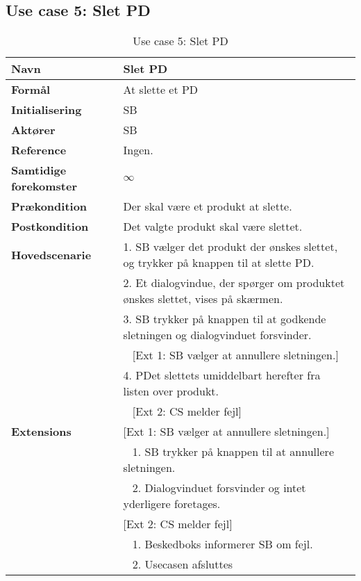 \subsection{Use case 5: Slet \gls{PD}}


\begin{table}[H]
\begin{tabularx}{\textwidth}{|l|X|}
\hline
\textbf{Navn}					& Slet \gls{PD} \\\hline
\textbf{Formål}					& At slette et \gls{PD} \\\hline
\textbf{Initialisering}			& \gls{SB} \\\hline
\textbf{Aktører}				& \gls{SB} \\\hline
\textbf{Reference}				& Ingen. \\\hline								
\textbf{Samtidige forekomster}	& $\infty$ \\\hline
\textbf{Prækondition}			& Der skal være et produkt at slette. \\\hline
\textbf{Postkondition}			& Det valgte produkt skal være slettet. \\
\hline
\textbf{Hovedscenarie}			& 1. \gls{SB} vælger det produkt der ønskes slettet, og trykker på knappen til at slette \gls{PD}.\\												
								& 2. Et dialogvindue, der spørger om produktet ønskes slettet, vises på skærmen.\\
								& 3. \gls{SB} trykker på knappen til at godkende sletningen og dialogvinduet forsvinder.\\
								& ~ [Ext 1: \gls{SB} vælger at annullere sletningen.]\\
								& 4. \gls{PD}et slettets umiddelbart herefter fra listen over produkt.\\
								& ~ [Ext 2: \gls{CS} melder fejl]\\
\hline
\textbf{Extensions}				& [Ext 1: \gls{SB} vælger at annullere sletningen.]\\
								& ~ 1. \gls{SB} trykker på knappen til at annullere sletningen.\\
								& ~ 2. Dialogvinduet forsvinder og intet yderligere foretages.\\
								& [Ext 2: \gls{CS} melder fejl] \\
								& ~ 1. Beskedboks informerer \gls{SB} om fejl. \\
								& ~ 2. Usecasen afsluttes \\\hline
\hline
\end{tabularx}
\caption{Use case 5: Slet \gls{PD}}
\label{tab:UCsp}
\end{table}